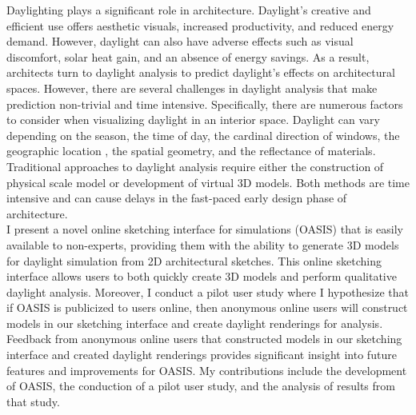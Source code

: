 Daylighting plays a significant role in architecture.
Daylight's creative and efficient use offers aesthetic visuals, increased productivity, and reduced energy demand. 
However, daylight can also have adverse effects such as visual discomfort, solar heat gain, and an absence of energy savings. 
%
As a result, architects turn to daylight analysis to predict daylight's effects on architectural spaces. However, there are several challenges in daylight analysis that make prediction non-trivial and time intensive. Specifically, there are numerous factors to consider when visualizing daylight in an interior space. Daylight can vary depending on the season, the time of day, the cardinal direction of windows, the geographic location , the spatial geometry, and the reflectance of materials. 
%
Traditional approaches to daylight analysis require either the construction of physical scale model or development of virtual 3D models. Both methods are time intensive and can cause delays in the fast-paced early design phase of architecture. \\

I present a novel online sketching interface for simulations (OASIS) that is easily available to non-experts, providing them with the ability to generate 3D models for daylight simulation from 2D architectural sketches. 
This online sketching interface allows users to both quickly create 3D models and perform qualitative daylight analysis.
%
Moreover, I conduct a pilot user study where I hypothesize that if OASIS is publicized to users online, then anonymous online users will construct models in our sketching interface and create daylight renderings for analysis. Feedback from anonymous online users that constructed models in our sketching interface and created daylight renderings provides significant insight into future features and improvements for OASIS.
%
My contributions include the development of OASIS, the conduction of a pilot user study, and the analysis of results from that study. \\
